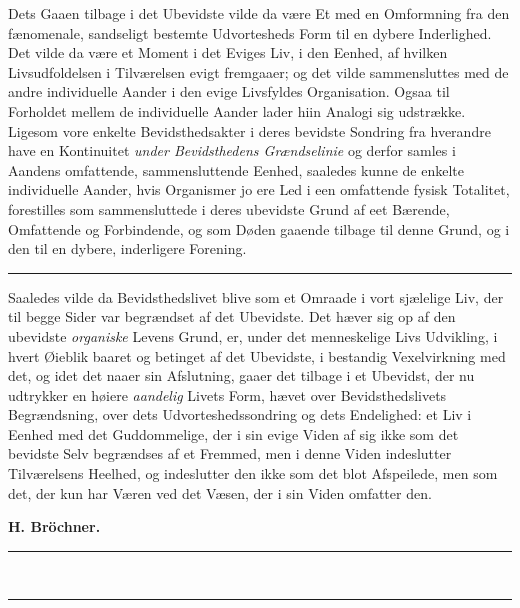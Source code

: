 \documentclass[12pt,a4paper,openany]{book}
\newcommand{\opage}[1]{\marginnote{\footnotesize\textit{[#1]}}}
\begin{document}
Dets Gaaen tilbage i det Ubevidste vilde da være Et med
en Omformning fra den fænomenale, sandseligt bestemte Udvortesheds
Form til en dybere Inderlighed. Det vilde da
\opage{57}være et Moment i det Eviges Liv, i den Eenhed, af hvilken
Livsudfoldelsen i Tilværelsen evigt fremgaaer; og det vilde
sammensluttes med de andre individuelle Aander i den evige
Livsfyldes Organisation. Ogsaa til Forholdet mellem de
individuelle Aander lader hiin Analogi sig udstrække. Ligesom
vore enkelte Bevidsthedsakter i deres bevidste Sondring
fra hverandre have en Kontinuitet \emph{under Bevidsthedens
Grændselinie} og derfor samles i Aandens omfattende,
sammensluttende Eenhed, saaledes kunne de enkelte individuelle
Aander, hvis Organismer jo ere Led i een omfattende fysisk
Totalitet, forestilles som sammensluttede i deres ubevidste
Grund af eet Bærende, Omfattende og Forbindende, og som
Døden gaaende tilbage til denne Grund, og i den til en
dybere, inderligere Forening.

\begin{center}\rule{2cm}{0.4pt}\end{center}

Saaledes vilde da Bevidsthedslivet blive som et Omraade
i vort sjælelige Liv, der til begge Sider var begrændset
af det Ubevidste. Det hæver sig op af den ubevidste
\emph{organiske} Levens Grund, er, under det menneskelige Livs
Udvikling, i hvert Øieblik baaret og betinget af det Ubevidste,
i bestandig Vexelvirkning med det, og idet det naaer sin
Afslutning, gaaer det tilbage i et Ubevidst, der nu udtrykker
en høiere \emph{aandelig} Livets Form, hævet over Bevidsthedslivets
Begrændsning, over dets Udvorteshedssondring og dets
Endelighed: et Liv i Eenhed med det Guddommelige, der i
sin evige Viden af sig ikke som det bevidste Selv begrændses
af et Fremmed, men i denne Viden indeslutter Tilværelsens
Heelhed, og indeslutter den ikke som det blot Afspeilede, men
som det, der kun har Væren ved det Væsen, der i sin Viden
omfatter den.

\begin{flushright}\textbf{H. Bröchner.}\end{flushright}
\begin{center}\rule{3cm}{0.4pt}\\[-10pt]\rule{3cm}{0.4pt}\end{center}
\end{document}
